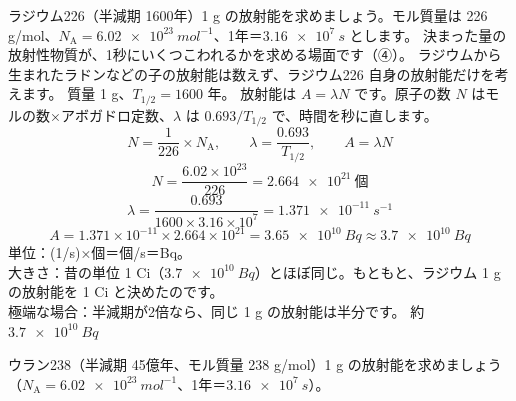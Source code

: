 \label{ph:原-12:ex4}
\begin{phreidai}
ラジウム226（半減期 1600年）1 g の放射能を求めましょう。モル質量は 226 g/mol、$N_{\mathrm A}=\qty{6.02e23}{mol^{-1}}$、1年＝$\qty{3.16e7}{s}$ とします。
\phbamen
決まった量の放射性物質が、1秒にいくつこわれるかを求める場面です（④）。
\phmushi
ラジウムから生まれたラドンなどの子の放射能は数えず、ラジウム226 自身の放射能だけを考えます。
\phzu
質量 1 g、$T_{1/2}=1600$ 年。
\phriyu
放射能は $A=\lambda N$ です。原子の数 $N$ はモルの数×アボガドロ定数、$\lambda$ は $0.693/T_{1/2}$ で、時間を秒に直します。
\phtateru
\[ N=\frac{1}{226}\times N_{\mathrm A},\qquad\lambda=\frac{0.693}{T_{1/2}},\qquad A=\lambda N \]
\phtoku
\[ N=\frac{6.02\times10^{23}}{226}=\qty{2.664e21}{個} \]
\[ \lambda=\frac{0.693}{1600\times3.16\times10^7}=\qty{1.371e-11}{s^{-1}} \]
\[ A=1.371\times10^{-11}\times2.664\times10^{21}=\qty{3.65e10}{Bq}\approx\qty{3.7e10}{Bq} \]
\phtashikame
単位：(1/s)×個＝個/s＝Bq。\\
大きさ：昔の単位 1 Ci（$\qty{3.7e10}{Bq}$）とほぼ同じ。もともと、ラジウム 1 g の放射能を 1 Ci と決めたのです。\\
極端な場合：半減期が2倍なら、同じ 1 g の放射能は半分です。
\kotae 約 $\qty{3.7e10}{Bq}$
\end{phreidai}
\begin{jibun}
ウラン238（半減期 45億年、モル質量 238 g/mol）1 g の放射能を求めましょう（$N_{\mathrm A}=\qty{6.02e23}{mol^{-1}}$、1年＝$\qty{3.16e7}{s}$）。
\end{jibun}

